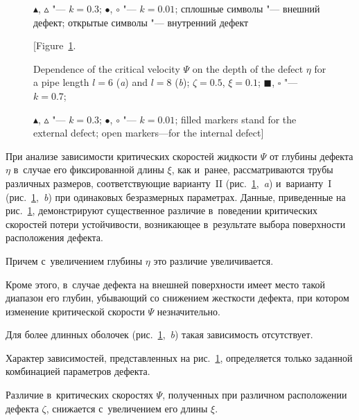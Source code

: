 \begin{figure}[b!]
\begin{minipage}[h]{0.96\textwidth}
{{\tiny $\blacktriangle$}, {\tiny $\vartriangle$} "--- $k = 0.3$; $\bullet$, $\circ$ "--- $k = 0.01$; сплошные символы "--- внешний дефект; открытые символы "--- внутренний дефект \label{dmg_fig8}}

\smallskip 

[Figure~\ref{dmg_fig8}.

Dependence of the critical velocity $\Psi$ on the depth of the defect $\eta$ for a pipe length $l = 6$ ({\sl a}) and $l = 8$ ({\sl b}); $\zeta = 0.5$, $\xi = 0.1$;  {\tiny $\blacksquare$}, {\tiny $\square$}  "--- $k = 0.7$; 

{\tiny $\blacktriangle$}, {\tiny $\vartriangle$} "--- $k = 0.3$; $\bullet$, $\circ$ "--- $k = 0.01$; filled markers stand for the external defect; open markers---for the internal defect]



\end{minipage}



\vspace{-3mm}



\end{figure}



При анализе зависимости критических скоростей жидкости $\Psi$ от глубины дефекта $\eta$ в~случае его фиксированной длины $\xi$, как и~ранее, рассматриваются трубы различных размеров, соответствующие варианту~II (рис.~\ref{dmg_fig8},~{\sl a}) и~варианту~I (рис.~\ref{dmg_fig8},~{\sl b}) при одинаковых безразмерных параметрах. Данные, приведенные на рис.~\ref{dmg_fig8}, демонстрируют существенное различие в~поведении критических скоростей потери устойчивости, возникающее в~результате выбора поверхности расположения дефекта. 

Причем с~увеличением глубины $\eta$ это различие увеличивается. 

Кроме этого, в~случае дефекта на внешней поверхности имеет место такой диапазон его глубин, убывающий со снижением жесткости дефекта, при котором изменение критической скорости $\Psi$ незначительно. 

Для более длинных оболочек (рис.~\ref{dmg_fig8},~{\sl b}) такая зависимость отсутствует.





Характер зависимостей, представленных на рис.~\ref{dmg_fig8}, определяется только заданной комбинацией параметров дефекта. 

Различие в~критических скоростях $\Psi$, полученных при различном расположении дефекта $\zeta$, снижается с~увеличением его длины $\xi$. 

